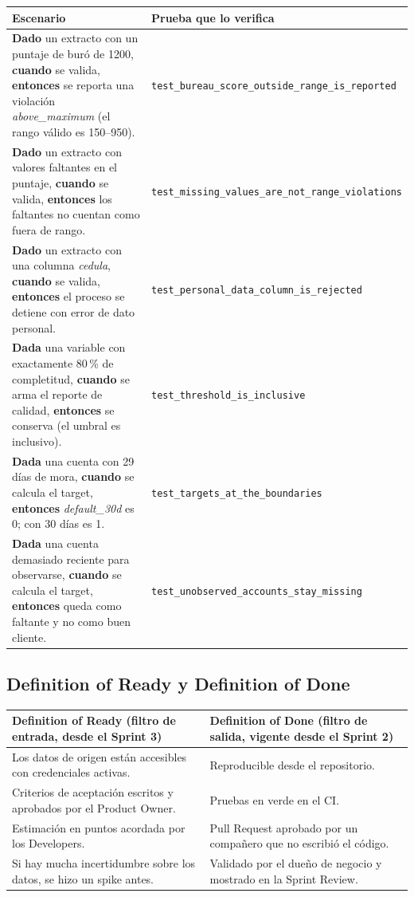 \documentclass[10pt,a4paper]{article}
\begin{document}
{\footnotesize
\begin{tabularx}{\linewidth}{@{}L L@{}}
\toprule
Escenario & Prueba que lo verifica \\
\midrule
\textbf{Dado} un extracto con un puntaje de buró de 1200, \textbf{cuando} se valida, \textbf{entonces} se reporta una violación \emph{above\_maximum} (el rango válido es 150--950). & \texttt{test\_bureau\_score\_outside\_range\_is\_reported} \\
\textbf{Dado} un extracto con valores faltantes en el puntaje, \textbf{cuando} se valida, \textbf{entonces} los faltantes no cuentan como fuera de rango. & \texttt{test\_missing\_values\_are\_not\_range\_violations} \\
\textbf{Dado} un extracto con una columna \emph{cedula}, \textbf{cuando} se valida, \textbf{entonces} el proceso se detiene con error de dato personal. & \texttt{test\_personal\_data\_column\_is\_rejected} \\
\textbf{Dada} una variable con exactamente 80\,\% de completitud, \textbf{cuando} se arma el reporte de calidad, \textbf{entonces} se conserva (el umbral es inclusivo). & \texttt{test\_threshold\_is\_inclusive} \\
\textbf{Dada} una cuenta con 29 días de mora, \textbf{cuando} se calcula el target, \textbf{entonces} \emph{default\_30d} es 0; con 30 días es 1. & \texttt{test\_targets\_at\_the\_boundaries} \\
\textbf{Dada} una cuenta demasiado reciente para observarse, \textbf{cuando} se calcula el target, \textbf{entonces} queda como faltante y no como buen cliente. & \texttt{test\_unobserved\_accounts\_stay\_missing} \\
\bottomrule
\end{tabularx}}

\subsection{Definition of Ready y Definition of Done}
{\footnotesize
\begin{tabularx}{\linewidth}{@{}L L@{}}
\toprule
Definition of Ready (filtro de entrada, desde el Sprint 3) & Definition of Done (filtro de salida, vigente desde el Sprint 2) \\
\midrule
Los datos de origen están accesibles con credenciales activas. & Reproducible desde el repositorio. \\
Criterios de aceptación escritos y aprobados por el Product Owner. & Pruebas en verde en el CI. \\
Estimación en puntos acordada por los Developers. & Pull Request aprobado por un compañero que no escribió el código. \\
Si hay mucha incertidumbre sobre los datos, se hizo un spike antes. & Validado por el dueño de negocio y mostrado en la Sprint Review. \\
\bottomrule
\end{tabularx}}
\end{document}
